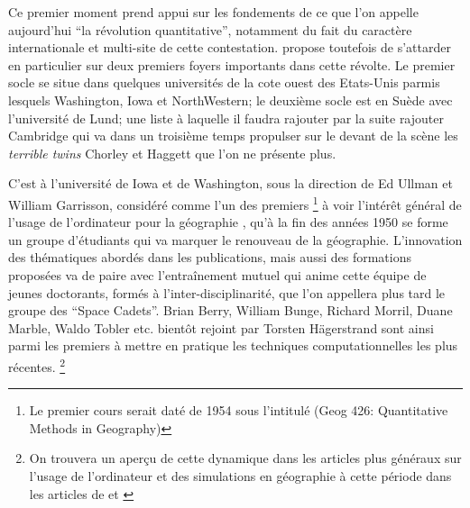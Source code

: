 {Ce premier moment prend appui sur les fondements de ce que l'on appelle aujourd'hui \enquote{la révolution quantitative}, notamment du fait du caractère internationale et multi-site de cette contestation. \textcite{Gould2004} propose toutefois de s'attarder en particulier sur deux premiers foyers importants dans cette révolte. Le premier socle se situe dans quelques universités de la cote ouest des Etats-Unis \autocite{Gould2004} parmis lesquels Washington, Iowa et NorthWestern; le deuxième socle est en Suède avec l'université de Lund; une liste à laquelle il faudra rajouter par la suite rajouter Cambridge qui va dans un troisième temps propulser sur le devant de la scène les \textit{terrible twins} Chorley et Haggett que l'on ne présente plus.

C'est à l'université de Iowa et de Washington, sous la direction de Ed Ullman et William Garrisson, considéré comme l'un des premiers \footnote {Le premier cours serait daté de 1954 sous l'intitulé (Geog 426: Quantitative Methods in Geography) } à voir l'intérêt général de l'usage de l'ordinateur pour la géographie , qu'à la fin des années 1950 se forme un groupe d'étudiants qui va marquer le renouveau de la géographie. L'innovation des thématiques abordés dans les publications, mais aussi des formations proposées va de paire avec l’entraînement mutuel qui anime cette équipe de jeunes doctorants, formés à l'inter-disciplinarité, que l'on appellera plus tard le groupe des \foreignquote{english}{Space Cadets}. Brian Berry, William Bunge, Richard Morril, Duane Marble, Waldo Tobler etc. bientôt rejoint par Torsten Hägerstrand sont ainsi parmi les premiers à mettre en pratique les techniques computationnelles les plus récentes. \footnote{ On trouvera un aperçu de cette dynamique dans les articles plus généraux sur l'usage de l'ordinateur et des simulations en géographie à cette période dans les articles de \textcite{Haggett1969} et \textcite{Marble1972}}

}
